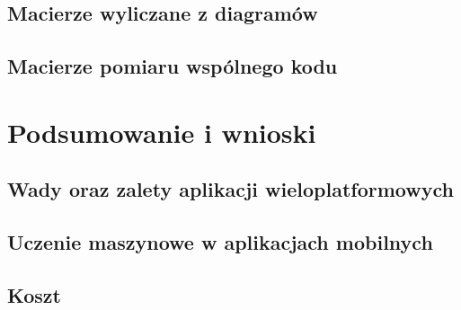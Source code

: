 \documentclass[brudnopis]{xmgr}
\begin{document}
\section{Macierze wyliczane z diagramów}

\section{Macierze pomiaru wspólnego kodu}

\chapter{Podsumowanie i wnioski}

\section{Wady oraz zalety aplikacji wieloplatformowych}

\section{Uczenie maszynowe w aplikacjach mobilnych}

\section{Koszt}

\summary




\oswiadczenie
\end{document}
